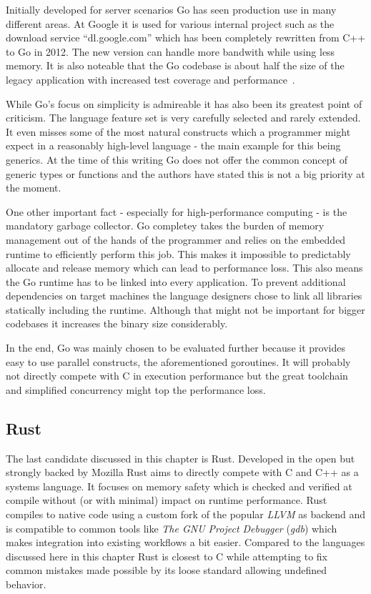 Initially developed for server scenarios Go has seen production use in many different areas. At Google it is used for various internal project such as the download service ``dl.google.com'' which has been completely rewritten from C++ to Go in 2012. The new version can handle more bandwith while using less memory. It is also noteable that the Go codebase is about half the size of the legacy application with increased test coverage and performance~\cite{go_dl_google}.

While Go's focus on simplicity is admireable it has also been its greatest point of criticism. The language feature set is very carefully selected and rarely extended. It even misses some of the most natural constructs which a programmer might expect in a reasonably high-level language - the main example for this being generics. At the time of this writing Go does not offer the common concept of generic types or functions and the authors have stated this is not a big priority at the moment.

One other important fact - especially for high-performance computing - is the mandatory garbage collector. Go completey takes the burden of memory management out of the hands of the programmer and relies on the embedded runtime to efficiently perform this job. This makes it impossible to predictably allocate and release memory which can lead to performance loss. This also means the Go runtime has to be linked into every application. To prevent additional dependencies on target machines the language designers chose to link all libraries statically including the runtime. Although that might not be important for bigger codebases it increases the binary size considerably.

In the end, Go was mainly chosen to be evaluated further because it provides easy to use parallel constructs, the aforementioned \glspl{goroutine}. It will probably not directly compete with C in execution performance but the great toolchain and simplified concurrency might top the performance loss.

\subsection*{Rust}
\label{subsec:State_of_the_art::Candidates::Rust}

The last candidate discussed in this chapter is Rust. Developed in the open but strongly backed by Mozilla Rust aims to directly compete with C and C++ as a systems language. It focuses on memory safety which is checked and verified at compile without (or with minimal) impact on runtime performance. Rust compiles to native code using a custom fork of the popular \textit{LLVM} as backend and is compatible to common tools like \textit{The GNU Project Debugger} (\textit{gdb}) which makes integration into existing workflows a bit easier. Compared to the languages discussed here in this chapter Rust is closest to C while attempting to fix common mistakes made possible by its loose standard allowing undefined behavior.

